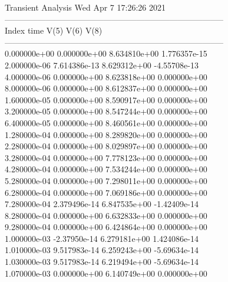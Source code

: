                                    Transient Analysis  Wed Apr  7 17:26:26  2021\\ \hline
--------------------------------------------------------------------------------\\ \hline
Index   time            V(5)            V(6)            V(8)            \\ \hline
--------------------------------------------------------------------------------\\ 	0.000000e+00	0.000000e+00	8.634810e+00	1.776357e-15	\\ 	2.000000e-06	7.614386e-13	8.629312e+00	-4.55708e-13	\\ 	4.000000e-06	0.000000e+00	8.623818e+00	0.000000e+00	\\ 	8.000000e-06	0.000000e+00	8.612837e+00	0.000000e+00	\\ 	1.600000e-05	0.000000e+00	8.590917e+00	0.000000e+00	\\ 	3.200000e-05	0.000000e+00	8.547244e+00	0.000000e+00	\\ 	6.400000e-05	0.000000e+00	8.460561e+00	0.000000e+00	\\ 	1.280000e-04	0.000000e+00	8.289820e+00	0.000000e+00	\\ 	2.280000e-04	0.000000e+00	8.029897e+00	0.000000e+00	\\ 	3.280000e-04	0.000000e+00	7.778123e+00	0.000000e+00	\\ 	4.280000e-04	0.000000e+00	7.534244e+00	0.000000e+00	\\ 	5.280000e-04	0.000000e+00	7.298011e+00	0.000000e+00	\\ 	6.280000e-04	0.000000e+00	7.069186e+00	0.000000e+00	\\ 	7.280000e-04	2.379496e-14	6.847535e+00	-1.42409e-14	\\ 	8.280000e-04	0.000000e+00	6.632833e+00	0.000000e+00	\\ 	9.280000e-04	0.000000e+00	6.424864e+00	0.000000e+00	\\ 	1.000000e-03	-2.37950e-14	6.279181e+00	1.424086e-14	\\ 	1.010000e-03	9.517983e-14	6.259243e+00	-5.69634e-14	\\ 	1.030000e-03	9.517983e-14	6.219494e+00	-5.69634e-14	\\ 	1.070000e-03	0.000000e+00	6.140749e+00	0.000000e+00	\\ \hline
